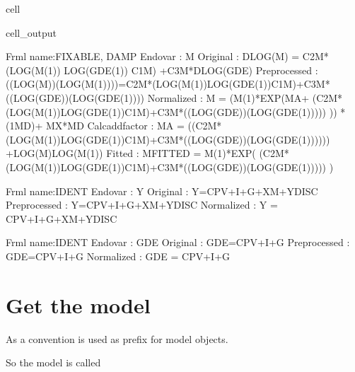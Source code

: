 \documentclass[letterpaper,10pt,english]{jupyterBook}
\begin{document}
\begin{sphinxuseclass}{cell}
\begin{sphinxVerbatimOutput}
\begin{sphinxuseclass}{cell_output}
\begin{sphinxVerbatim}[commandchars=\\\{\}]
Frml name:\PYGZlt{}FIXABLE, DAMP\PYGZgt{}
Endo\PYGZus{}var        : M
Original        :  DLOG(M) =     \PYGZhy{}C2\PYGZus{}M*  (LOG(M(\PYGZhy{}1))\PYGZhy{}   LOG(GDE(\PYGZhy{}1))    \PYGZhy{} C1\PYGZus{}M)   +C3\PYGZus{}M*DLOG(GDE)
Preprocessed    : ((LOG(M))\PYGZhy{}(LOG(M(\PYGZhy{}1))))=\PYGZhy{}C2\PYGZus{}M*(LOG(M(\PYGZhy{}1))\PYGZhy{}LOG(GDE(\PYGZhy{}1))\PYGZhy{}C1\PYGZus{}M)+C3\PYGZus{}M*((LOG(GDE))\PYGZhy{}(LOG(GDE(\PYGZhy{}1))))
Normalized      : M = (M(\PYGZhy{}1)*EXP(M\PYGZus{}A+ (\PYGZhy{}C2\PYGZus{}M*(LOG(M(\PYGZhy{}1))\PYGZhy{}LOG(GDE(\PYGZhy{}1))\PYGZhy{}C1\PYGZus{}M)+C3\PYGZus{}M*((LOG(GDE))\PYGZhy{}(LOG(GDE(\PYGZhy{}1))))) )) * (1\PYGZhy{}M\PYGZus{}D)+ M\PYGZus{}X*M\PYGZus{}D 
Calc\PYGZus{}add\PYGZus{}factor : M\PYGZus{}A = \PYGZhy{} ((\PYGZhy{}C2\PYGZus{}M*(LOG(M(\PYGZhy{}1))\PYGZhy{}LOG(GDE(\PYGZhy{}1))\PYGZhy{}C1\PYGZus{}M)+C3\PYGZus{}M*((LOG(GDE))\PYGZhy{}(LOG(GDE(\PYGZhy{}1)))))) +LOG(M)\PYGZhy{}LOG(M(\PYGZhy{}1))
Fitted          : M\PYGZus{}FITTED = M(\PYGZhy{}1)*EXP( (\PYGZhy{}C2\PYGZus{}M*(LOG(M(\PYGZhy{}1))\PYGZhy{}LOG(GDE(\PYGZhy{}1))\PYGZhy{}C1\PYGZus{}M)+C3\PYGZus{}M*((LOG(GDE))\PYGZhy{}(LOG(GDE(\PYGZhy{}1))))) )

Frml name:\PYGZlt{}IDENT\PYGZgt{}
Endo\PYGZus{}var        : Y
Original        :  Y=CPV+I+G+X\PYGZhy{}M+YDISC 
Preprocessed    : Y=CPV+I+G+X\PYGZhy{}M+YDISC
Normalized      : Y = CPV+I+G+X\PYGZhy{}M+YDISC

Frml name:\PYGZlt{}IDENT\PYGZgt{}
Endo\PYGZus{}var        : GDE
Original        :  GDE=CPV+I+G
Preprocessed    : GDE=CPV+I+G
Normalized      : GDE = CPV+I+G
\end{sphinxVerbatim}

\end{sphinxuseclass}\end{sphinxVerbatimOutput}

\end{sphinxuseclass}

\section{Get the model}
\label{\detokenize{content/howto/smallmodel/modelstart:get-the-model}}
\sphinxAtStartPar
As a convention  is used as prefix for model objects.

\sphinxAtStartPar
So the model is called 
\end{document}
